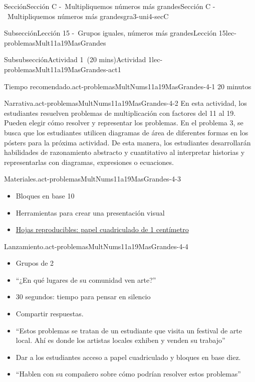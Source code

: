 \documentclass[oneside,10pt,]{article}
\begin{document}
\begin{sectionptx}{Sección}{Sección C -~Multipliquemos números más grandes}{}{Sección C -~Multipliquemos números más grandes}{}{}{gra3-uni4-secC}
\begin{subsectionptx}{Subsección}{Lección 15 -~Grupos iguales, números más grandes}{}{Lección 15}{}{}{lec-problemasMult11a19MasGrandes}
\typeout{************************************************}
%
\begin{subsubsectionptx}{Subsubsección}{Actividad 1~(20 mins)}{}{Actividad 1}{}{}{lec-problemasMult11a19MasGrandes-act1}
\par
\begin{paragraphs}{Tiempo recomendado.}{act-problemasMultNums11a19MasGrandes-4-1}%
20 minutos%
\end{paragraphs}%
\begin{paragraphs}{Narrativa.}{act-problemasMultNums11a19MasGrandes-4-2}%
En esta actividad, los estudiantes resuelven problemas de multiplicación con factores del 11 al 19. Pueden elegir cómo resolver y representar los problemas. En el problema 3, se busca que los estudiantes utilicen diagramas de área de diferentes formas en los pósters para la próxima actividad. De esta manera, los estudiantes desarrollarán habilidades de razonamiento abstracto y cuantitativo al interpretar historias y representarlas con diagramas, expresiones o ecuaciones.%
\end{paragraphs}%
\begin{paragraphs}{Materiales.}{act-problemasMultNums11a19MasGrandes-4-3}%
%
\begin{itemize}[label=\textbullet]
\item{}Bloques en base 10%
\item{}Herramientas para crear una presentación visual%
\item{}\hyperref[blm-papelCuadriculadoCentimetro]{Hojas reproducibles: papel cuadriculado de 1 centímetro}%
\end{itemize}
\end{paragraphs}%
\begin{paragraphs}{Lanzamiento.}{act-problemasMultNums11a19MasGrandes-4-4}%
%
\begin{itemize}[label=\textbullet]
\item{}Grupos de 2%
\item{}``¿En qué lugares de su comunidad ven arte?''%
\item{}30 segundos: tiempo para pensar en silencio%
\item{}Compartir respuestas.%
\item{}``Estos problemas se tratan de un estudiante que visita un festival de arte local. Ahí es donde los artistas locales exhiben y venden su trabajo''%
\item{}Dar a los estudiantes acceso a papel cuadriculado y bloques en base diez.%
\item{}``Hablen con su compañero sobre cómo podrían resolver estos problemas''%

\end{itemize}
\end{paragraphs}
\end{subsubsectionptx}
\end{subsectionptx}
\end{sectionptx}
\end{document}
